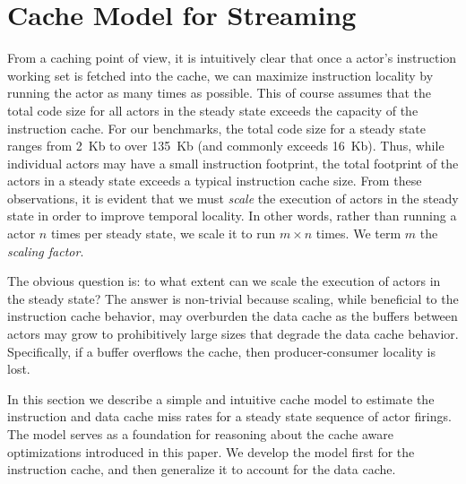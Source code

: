 \section{Cache Model for Streaming}
\label{sec:cache-model}

From a caching point of view, it is intuitively clear that once a
actor's instruction working set is fetched into the cache, we can
maximize instruction locality by running the actor as many times as
possible.  This of course assumes that the total code size for
all actors in the steady state exceeds the capacity of the
instruction cache.
For our benchmarks, the total code size for a steady state
ranges from 2~Kb to over 135~Kb (and commonly exceeds 16~Kb). Thus, while individual actors may have a
small instruction footprint, the total footprint of the actors in a
steady state exceeds a typical instruction cache size.
From these observations, it is evident that we must {\it scale} the
execution of actors in the steady state in order to improve temporal
locality. In other words, rather than running a actor $n$ times per
steady state, we scale it to run $m \times n$ times.
%
We term $m$ the {\it scaling factor}.

The obvious question is: to what extent can we scale the execution of
actors in the steady state? The answer is non-trivial because
scaling, while beneficial to the instruction cache behavior, may
overburden the data cache as the buffers between actors may grow to
prohibitively large sizes that degrade the data cache
behavior. Specifically, if a buffer overflows the cache, then
producer-consumer locality is lost.

In this section we describe a simple and intuitive cache model to
estimate the instruction and data cache miss rates for a steady state
sequence of actor firings. The model serves as a foundation for
reasoning about the cache aware optimizations introduced in this
paper. We develop the model first for the instruction cache, and then
generalize it to account for the data cache.






